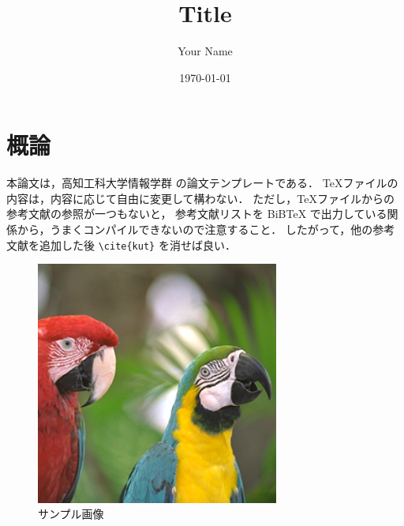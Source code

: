 \documentclass[mingoth]{kut-paper}
\title{Title}
\author{Your Name}
\date{\today}
\begin{document}
\maketitle

\chapter{概論}

本論文は，高知工科大学情報学群 \cite{kut} の論文テンプレートである．
\TeX ファイルの内容は，内容に応じて自由に変更して構わない．
ただし，\TeX ファイルからの参考文献の参照が一つもないと，
参考文献リストを BiBTeX で出力している関係から，うまくコンパイルできないので注意すること．
したがって，他の参考文献を追加した後 \verb|\cite{kut}| を消せば良い．

\begin{figure}[ht]
  \centering
  \includegraphics[width=8cm]{images/Parrots.png}
  \caption{サンプル画像}
  \label{fig:sample}
\end{figure}




%
%   
%   
\end{document}
